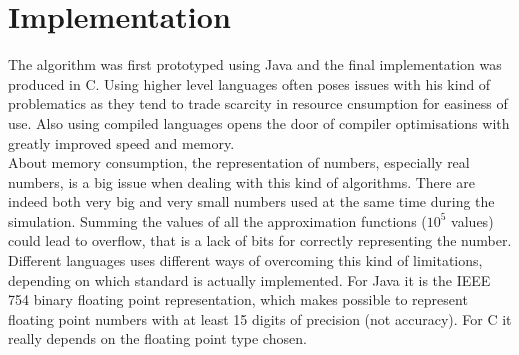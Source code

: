 \documentclass{article}
\begin{document}
	\section{Implementation}\label{sec:implementation}
		The algorithm was first prototyped using Java and the final implementation was produced in C. Using higher level languages often poses issues with his kind of problematics as they tend to trade scarcity in resource cnsumption for easiness of use. Also using compiled languages opens the door of compiler optimisations with greatly improved speed and memory.\\\indent
		About memory consumption, the representation of numbers, especially real numbers, is a big issue when dealing with this kind of algorithms. There are indeed both very big and very small numbers used at the same time during the simulation. Summing the values of all the approximation functions ($10^5$ values) could lead to overflow, that is a lack of bits for correctly representing the number. Different languages uses different ways of overcoming this kind of limitations, depending on which standard is actually implemented. For Java it is the IEEE 754 binary floating point representation, which makes possible to represent floating point numbers with at least 15 digits of precision (not accuracy). For C it really depends on the floating point type chosen.
\end{document}
